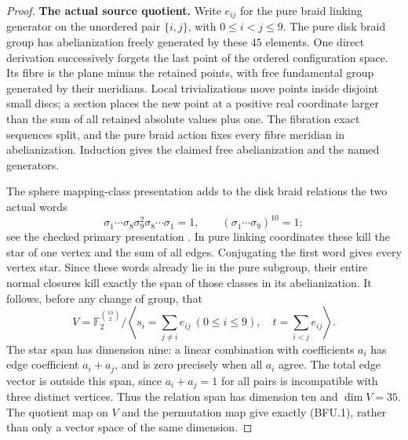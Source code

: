 \begin{proof}
\par\medskip\noindent\textbf{The actual source quotient.}\quad
Write $e_{ij}$ for the pure braid linking generator on the
unordered pair $\{i,j\}$, with $0\leq i<j\leq9$.  The
pure disk braid group has abelianization freely generated
by these $45$ elements.  One direct derivation successively
forgets the last point of the ordered configuration space.
Its fibre is the plane minus the retained points, with free
fundamental group generated by their meridians.  Local
trivializations move points inside disjoint small discs;
a section places the new point at a positive real coordinate
larger than the sum of all retained absolute values plus one.
The fibration exact sequences split, and the pure braid action
fixes every fibre meridian in abelianization.  Induction gives
the claimed free abelianization and the named generators.

The sphere mapping-class presentation adds to the disk braid
relations the two actual words
\[
 \sigma_1\cdots\sigma_8\sigma_9^2\sigma_8\cdots\sigma_1=1,
 \qquad(\sigma_1\cdots\sigma_9)^{10}=1;
                                                               \tag{BFU.5}
\]
see the checked primary presentation
\cite[Theorem~3.2, printed p.~6]{CA_EndoKamada2016}.
In pure linking coordinates these kill the star of one
vertex and the sum of all edges.  Conjugating the first
word gives every vertex star.  Since these words already
lie in the pure subgroup, their entire normal closures
kill exactly the span of those classes in its abelianization.
It follows, before any change of group, that
\[
 V=\mathbb F_2^{\binom{10}{2}}\big/
 \left\langle
   s_i=\sum_{j\ne i}e_{ij}\ (0\leq i\leq9),\quad
   t=\sum_{i<j}e_{ij}
 \right\rangle.
                                                               \tag{BFU.6}
\]
The star span has dimension nine: a linear combination
with coefficients $a_i$ has edge coefficient $a_i+a_j$,
and is zero precisely when all $a_i$ agree.  The total edge
vector is outside this span, since $a_i+a_j=1$ for all
pairs is incompatible with three distinct vertices.
Thus the relation span has dimension ten and $\dim V=35$.
The quotient map on $V$ and the permutation map give
exactly (BFU.1), rather than only a vector space of the
same dimension.


\end{proof}
